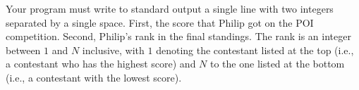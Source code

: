Your program must write to standard output a single line with two integers separated by a single space. First, the score that Philip got on the POI competition. Second, Philip's rank in the final standings. The rank is an integer between $1$ and $N$ inclusive, with $1$ denoting the contestant listed at the top (i.e., a contestant who has the highest score) and $N$ to the one listed at the bottom (i.e., a contestant with the lowest score).